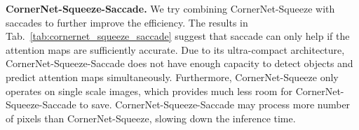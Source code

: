 \documentclass{bmvc2k}
\begin{document}
\begin{table}
    \centering
    \caption{Saccade only helps if the attention maps are sufficiently accurate.}
    \label{tab:cornernet_squeeze_saccade}
    \vspace{-3mm}
\end{table}

\smallskip \noindent \textbf{CornerNet-Squeeze-Saccade.} We try combining CornerNet-Squeeze with saccades to further improve the efficiency. The results in Tab.~\ref{tab:cornernet_squeeze_saccade} suggest that saccade can only help if the attention maps are sufficiently accurate. Due to its ultra-compact architecture, CornerNet-Squeeze-Saccade does not have enough capacity to detect objects and predict attention maps simultaneously. Furthermore, CornerNet-Squeeze only operates on single scale images, which provides much less room for CornerNet-Squeeze-Saccade to save. CornerNet-Squeeze-Saccade may process more number of pixels than CornerNet-Squeeze, slowing down the inference time.

\begin{table}[h]
    \centering
    \caption{CornerNet-Lite versus CornerNet and YOLOv3 on COCO test set.}
    \label{tab:coco_test}
\end{table}
\end{document}
